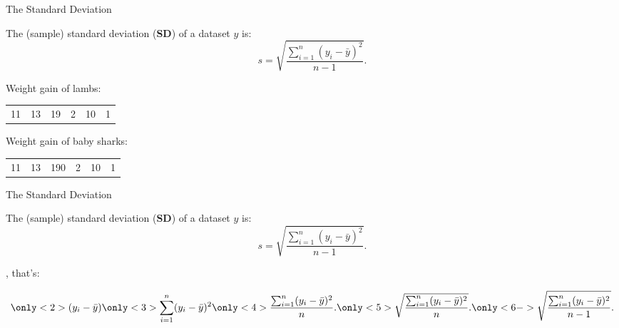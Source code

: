 \begin{frame}{The Standard Deviation}

    The (sample) standard deviation (\textbf{SD}) of a dataset $y$ is:
    \[
        s = \sqrt{\frac{\sum_{i=1}^n (y_i - \bar y)^2 }{ n-1 } } .
    \]


    \vspace{3em}
    \pause

     Weight gain of lambs:
    \begin{center}
        \begin{tabular}{cccccc}
            11 & 13 & 19 & 2 & 10 & 1
        \end{tabular}
    \end{center}

    \pause

    \vspace{3em}

     Weight gain of baby sharks:
    \begin{center}
        \begin{tabular}{cccccc}
            11 & 13 & 190 & 2 & 10 & 1
        \end{tabular}
    \end{center}

\end{frame}

\begin{frame}{The Standard Deviation}

    The (sample) standard deviation (\textbf{SD}) of a dataset $y$ is:
    \[
        s = \sqrt{\frac{\sum_{i=1}^n (y_i - \bar y)^2 }{ n-1 } } .
    \]

    \vspace{2em}
    \pause

    , that's:

\centering
{} 

\[
    \only<2>{(y_i - \bar y) }
    \only<3>{ \sum_{i=1}^n (y_i - \bar y)^2 }
    \only<4>{{\frac{\sum_{i=1}^n (y_i - \bar y)^2 }{ n } } .}
    \only<5>{\sqrt{\frac{\sum_{i=1}^n (y_i - \bar y)^2 }{ n } } .}
    \only<6->{\sqrt{\frac{\sum_{i=1}^n (y_i - \bar y)^2 }{ n-1 } } .}
\]

\end{frame}


